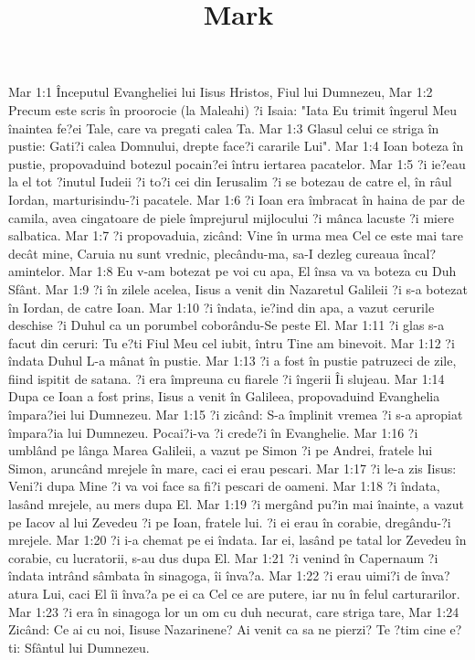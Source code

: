 

\title{Mark}

Mar 1:1  Începutul Evangheliei lui Iisus Hristos, Fiul lui Dumnezeu,
Mar 1:2  Precum este scris în proorocie (la Maleahi) ?i Isaia: "Iata Eu trimit îngerul Meu înaintea fe?ei Tale, care va pregati calea Ta.
Mar 1:3  Glasul celui ce striga în pustie: Gati?i calea Domnului, drepte face?i cararile Lui".
Mar 1:4  Ioan boteza în pustie, propovaduind botezul pocain?ei întru iertarea pacatelor.
Mar 1:5  ?i ie?eau la el tot ?inutul Iudeii ?i to?i cei din Ierusalim ?i se botezau de catre el, în râul Iordan, marturisindu-?i pacatele.
Mar 1:6  ?i Ioan era îmbracat în haina de par de camila, avea cingatoare de piele împrejurul mijlocului ?i mânca lacuste ?i miere salbatica.
Mar 1:7  ?i propovaduia, zicând: Vine în urma mea Cel ce este mai tare decât mine, Caruia nu sunt vrednic, plecându-ma, sa-I dezleg cureaua încal?amintelor.
Mar 1:8  Eu v-am botezat pe voi cu apa, El însa va va boteza cu Duh Sfânt.
Mar 1:9  ?i în zilele acelea, Iisus a venit din Nazaretul Galileii ?i s-a botezat în Iordan, de catre Ioan.
Mar 1:10  ?i îndata, ie?ind din apa, a vazut cerurile deschise ?i Duhul ca un porumbel coborându-Se peste El.
Mar 1:11  ?i glas s-a facut din ceruri: Tu e?ti Fiul Meu cel iubit, întru Tine am binevoit.
Mar 1:12  ?i îndata Duhul L-a mânat în pustie.
Mar 1:13  ?i a fost în pustie patruzeci de zile, fiind ispitit de satana. ?i era împreuna cu fiarele ?i îngerii Îi slujeau.
Mar 1:14  Dupa ce Ioan a fost prins, Iisus a venit în Galileea, propovaduind Evanghelia împara?iei lui Dumnezeu.
Mar 1:15  ?i zicând: S-a împlinit vremea ?i s-a apropiat împara?ia lui Dumnezeu. Pocai?i-va ?i crede?i în Evanghelie.
Mar 1:16  ?i umblând pe lânga Marea Galileii, a vazut pe Simon ?i pe Andrei, fratele lui Simon, aruncând mrejele în mare, caci ei erau pescari.
Mar 1:17  ?i le-a zis Iisus: Veni?i dupa Mine ?i va voi face sa fi?i pescari de oameni.
Mar 1:18  ?i îndata, lasând mrejele, au mers dupa El.
Mar 1:19  ?i mergând pu?in mai înainte, a vazut pe Iacov al lui Zevedeu ?i pe Ioan, fratele lui. ?i ei erau în corabie, dregându-?i mrejele.
Mar 1:20  ?i i-a chemat pe ei îndata. Iar ei, lasând pe tatal lor Zevedeu în corabie, cu lucratorii, s-au dus dupa El.
Mar 1:21  ?i venind în Capernaum ?i îndata intrând sâmbata în sinagoga, îi înva?a.
Mar 1:22  ?i erau uimi?i de înva?atura Lui, caci El îi înva?a pe ei ca Cel ce are putere, iar nu în felul carturarilor.
Mar 1:23  ?i era în sinagoga lor un om cu duh necurat, care striga tare,
Mar 1:24  Zicând: Ce ai cu noi, Iisuse Nazarinene? Ai venit ca sa ne pierzi? Te ?tim cine e?ti: Sfântul lui Dumnezeu.
